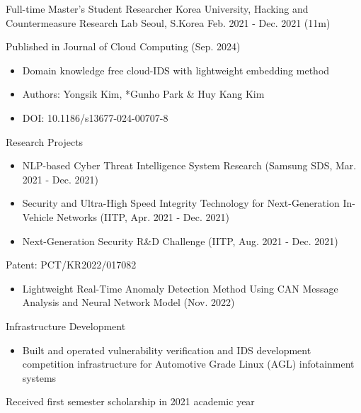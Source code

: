 \begin{cventries}
\cventry
    {Full-time Master's Student Researcher} %
    {Korea University, Hacking and Countermeasure Research Lab} %
    {Seoul, S.Korea} %
    {Feb. 2021 - Dec. 2021 (11m)} %
    {
      \begin{cvitems}
        \item {Published in Journal of Cloud Computing (Sep. 2024)}
        \begin{itemize}
          \item {Domain knowledge free cloud-IDS with lightweight embedding method}
          \item {Authors: Yongsik Kim, *Gunho Park \& Huy Kang Kim}
          \item {DOI: 10.1186/s13677-024-00707-8}
        \end{itemize}
        \item {Research Projects}
        \begin{itemize}
          \item {NLP-based Cyber Threat Intelligence System Research (Samsung SDS, Mar. 2021 - Dec. 2021)}
          \item {Security and Ultra-High Speed Integrity Technology for Next-Generation In-Vehicle Networks (IITP, Apr. 2021 - Dec. 2021)}
          \item {Next-Generation Security R\&D Challenge (IITP, Aug. 2021 - Dec. 2021)}
        \end{itemize}
        \item {Patent: PCT/KR2022/017082}
        \begin{itemize}
          \item {Lightweight Real-Time Anomaly Detection Method Using CAN Message Analysis and Neural Network Model (Nov. 2022)}
        \end{itemize}
        \item {Infrastructure Development}
        \begin{itemize}
          \item {Built and operated vulnerability verification and IDS development competition infrastructure for Automotive Grade Linux (AGL) infotainment systems}
        \end{itemize}
        \item {Received first semester scholarship in 2021 academic year}
      \end{cvitems}
    }


\end{cventries}
